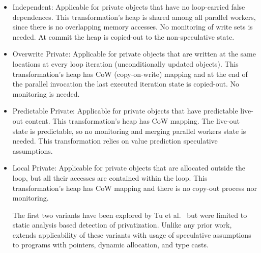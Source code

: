 \begin{itemize}
%
\item Independent: Applicable for private objects that have no
loop-carried false dependences. This transformation's heap is shared
among all parallel workers, since there is no overlapping memory
accesses.
%
No monitoring of write sets is needed. At commit the heap is copied-out
to the non-speculative state.
%


\item Overwrite Private: Applicable for private objects that are
written at the same locations at every loop iteration (unconditionally
updated objects). This transformation's heap has CoW (copy-on-write) mapping
and at the end of the parallel invocation the last executed iteration
state is copied-out. No monitoring is needed.

%

\item Predictable Private: Applicable for private objects that have
predictable live-out content. This transformation's heap has CoW mapping. The
live-out state is predictable, so no monitoring and merging parallel
workers state is needed. This transformation relies on value
prediction speculative assumptions.

\item Local Private: Applicable for private objects that are allocated
outside the loop, but all their accesses are contained within the
loop. This transformation's heap has CoW mapping and there is no copy-out
process nor monitoring.

The first two variants have been explored by Tu et
al.~\cite{ARRAY_privatization} but were limited to static analysis
based detection of privatization.  Unlike any prior work, \name
extends applicability of these variants with usage of speculative
assumptions to programs with pointers, dynamic allocation, and type
casts.

\end{itemize}

